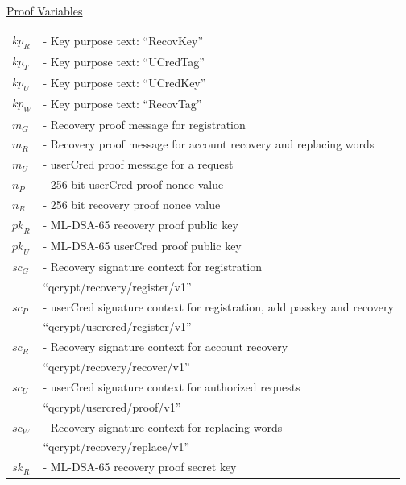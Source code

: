 \documentclass{article}
\newlength{\stanzagap}
\newlength{\stanzawidth}
\newlength{\stanzabox}
\newenvironment{stanza}[1][\stanzawidth]
  {\par\addvspace{\stanzagap}%
   \setlength{\stanzabox}{\dimexpr\linewidth-\parindent\relax}%
   \ifdim\stanzabox>#1\setlength{\stanzabox}{#1}\fi
   \noindent\hspace*{\parindent}\begin{minipage}{\stanzabox}}
  {\end{minipage}\par\addvspace{\stanzagap}}
\begin{document}
\begin{stanza}
\underline{Proof Variables}\\

\begin{tabular}{@{}p{5mm} l}
$\mathit{kp}_R$ & \textrm{ - Key purpose text: ``RecovKey''} \\
$\mathit{kp}_T$ & \textrm{ - Key purpose text: ``UCredTag''} \\
$\mathit{kp}_U$ & \textrm{ - Key purpose text: ``UCredKey''} \\
$\mathit{kp}_W$ & \textrm{ - Key purpose text: ``RecovTag''} \\
$m_G$ & \textrm{ - Recovery proof message for registration} \\
$m_R$ & \textrm{ - Recovery proof message for account recovery and replacing words} \\
$m_U$ & \textrm{ - userCred proof message for a request} \\
$n_P$ & \textrm{ - 256 bit userCred proof nonce value} \\
$n_R$ & \textrm{ - 256 bit recovery proof nonce value} \\
$\mathit{pk}_R$ & \textrm{ - ML-DSA-65 recovery proof public key} \\
$\mathit{pk}_U$ & \textrm{ - ML-DSA-65 userCred proof public key} \\
$\mathit{sc}_G$ & \textrm{ - Recovery signature context for registration} \\
& \phantom{\textrm{ - }}\textrm{``qcrypt/recovery/register/v1''} \\
$\mathit{sc}_P$ & \textrm{ - userCred signature context for registration, add passkey and recovery} \\
& \phantom{\textrm{ - }}\textrm{``qcrypt/usercred/register/v1''} \\
$\mathit{sc}_R$ & \textrm{ - Recovery signature context for account recovery} \\
& \phantom{\textrm{ - }}\textrm{``qcrypt/recovery/recover/v1''} \\
$\mathit{sc}_U$ & \textrm{ - userCred signature context for authorized requests} \\
& \phantom{\textrm{ - }}\textrm{``qcrypt/usercred/proof/v1''} \\
$\mathit{sc}_W$ & \textrm{ - Recovery signature context for replacing words} \\
& \phantom{\textrm{ - }}\textrm{``qcrypt/recovery/replace/v1''} \\
$\mathit{sk}_R$ & \textrm{ - ML-DSA-65 recovery proof secret key} \\

\end{tabular}
\end{stanza}
\end{document}
